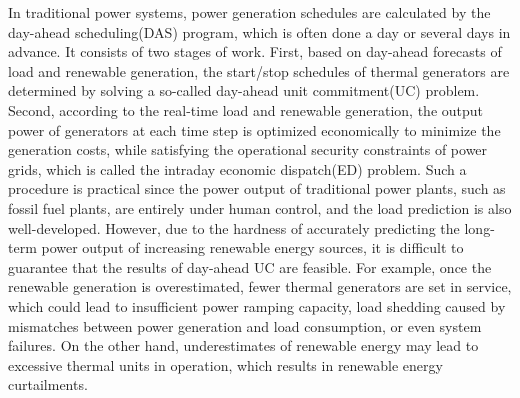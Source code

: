 In traditional power systems, power generation schedules are calculated by the day-ahead scheduling(DAS) program, which is often done a day or several days in advance. It consists of two stages of work. First, based on day-ahead forecasts of load and renewable generation, the start/stop schedules of thermal generators are determined by solving a so-called day-ahead unit commitment(UC) problem. Second, according to the real-time load and renewable generation, the output power of generators at each time step is optimized economically to minimize the generation costs, while satisfying the operational security constraints of power grids, which is called the intraday economic dispatch(ED) problem.
Such a procedure is practical since the power output of traditional power plants, such as fossil fuel plants, are entirely under human control, and the load prediction is also well-developed. However, due to the hardness of accurately predicting the long-term power output of increasing renewable energy sources, it is difficult to guarantee that the results of day-ahead UC are feasible.
For example, once the renewable generation is overestimated, fewer thermal generators are set in service, which could lead to insufficient power ramping capacity, load shedding caused by mismatches between power generation and load consumption, or even system failures. 
On the other hand, underestimates of renewable energy may lead to excessive thermal units in operation, which results in renewable energy curtailments.

